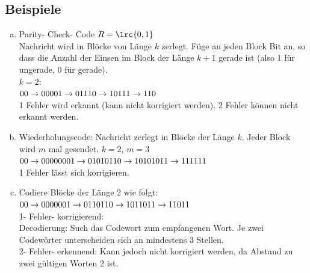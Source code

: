 	\subsection{Beispiele}
		\begin{enumerate}[a)]
			\item Parity- Check- Code
				$R=\lrc{0,1}$\\
				Nachricht wird in Blöcke von Länge $k$ zerlegt. Füge an jeden Block Bit an, so dass die Anzahl der Einsen im Block der Länge $k+1$ gerade ist (also 1 für ungerade, 0 für gerade).\\
				$k=2$:\\
				$00\rightarrow 000\\
				01\rightarrow 011\\
				10\rightarrow 101\\
				11\rightarrow 110$\\
				1 Fehler wird erkannt (kann nicht korrigiert werden). 2 Fehler können nicht erkannt werden.
			\item Wiederholungscode: Nachricht zerlegt in Blöcke der Länge $k$. Jeder Block wird $m$ mal gesendet. $k=2$, $m=3$\\
				$00\rightarrow 000000\\
				01\rightarrow 010101\\
				10\rightarrow101010\\
				11\rightarrow111111$\\
				1 Fehler lässt sich korrigieren.
			\item Codiere Blöcke der Länge 2 wie folgt:\\
				$00\rightarrow 00000\\
				01\rightarrow 01101\\
				10\rightarrow 10110\\
				11\rightarrow 11011$\\
				1- Fehler- korrigierend:\\
				Decodierung: Such das  Codewort zum empfangenen Wort. Je zwei\\Codewörter unterscheiden sich an mindestens 3 Stellen.\\
				2- Fehler- erkennend: Kann jedoch nicht korrigiert werden, da Abstand zu\\
				zwei gültigen Worten 2 ist.
		\end{enumerate}

